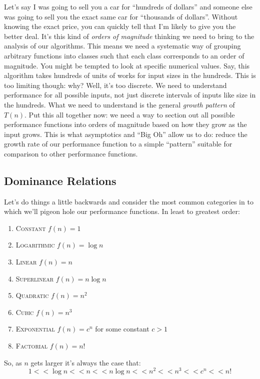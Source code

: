 \documentclass[]{tufte-handout}
\begin{document}
Let's say I was going to sell you a car for ``hundreds of dollars'' and someone else was going to sell you the exact same car for ``thousands of dollars''.  Without knowing the exact price, you can quickly tell that I'm likely to give you the better deal. It's this kind of \textit{orders of magnitude} thinking we need to bring to the analysis of our algorithms.  This means we need a systematic way of grouping arbitrary functions into classes such that each class corresponds to an order of magnitude. You might be tempted to look at specific numerical values. Say, this algorithm takes hundreds of units of works for input sizes in the hundreds.  This is too limiting though: why? Well, it's too discrete. We need to understand performance for all possible inputs, not just discrete intervals of inputs like size in the hundreds. What we need to understand is the general \textit{growth pattern} of $T(n)$. Put this all together now: we need a way to section out all possible performance functions into orders of magnitude based on how they grow as the input grows. This is what asymptotics and ``Big Oh'' allow us to do: reduce the growth rate of our performance function to a simple ``pattern'' suitable for comparison to other performance functions.

\subsection{Dominance Relations}

Let's do things a little backwards and consider the most common categories in to which we'll pigeon hole our performance functions. In least to greatest order:
\begin{enumerate}
\item \textsc{Constant} $f(n) = 1$
\item \textsc{Logarithmic} $f(n) = \log n$
\item \textsc{Linear} $f(n) = n$
\item \textsc{Superlinear} $f(n) = n \log n$
\item \textsc{Quadratic} $f(n) = n^2$
\item \textsc{Cubic} $f(n) = n^3$
\item \textsc{Exponential} $f(n) = c^n$ for some constant $c>1$
\item \textsc{Factorial} $f(n) = n!$ 
\end{enumerate}
So, as $n$ gets larger it's always the case that:
\[ 1 << \log n << n << n \log n << n^2 << n^3 << c^n << n! \]
\end{document}
